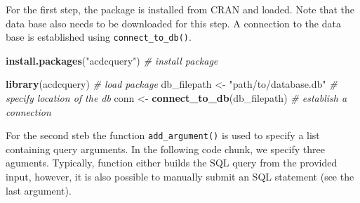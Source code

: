 \documentclass[
  man,floatsintext]{apa6}
\newenvironment{Shaded}{\begin{snugshade}}{\end{snugshade}}
\newcommand{\CommentTok}[1]{\textcolor[rgb]{0.56,0.35,0.01}{\textit{#1}}}
\newcommand{\FunctionTok}[1]{\textcolor[rgb]{0.13,0.29,0.53}{\textbf{#1}}}
\newcommand{\NormalTok}[1]{#1}
\newcommand{\OtherTok}[1]{\textcolor[rgb]{0.56,0.35,0.01}{#1}}
\newcommand{\StringTok}[1]{\textcolor[rgb]{0.31,0.60,0.02}{#1}}
\begin{document}
For the first step, the package is installed from CRAN and loaded. Note that the data base also needs to be downloaded for this step. A connection to the data base is established using \texttt{connect\_to\_db()}.

\begin{Shaded}
\begin{Highlighting}[]
\FunctionTok{install.packages}\NormalTok{(}\StringTok{"acdcquery"}\NormalTok{) }\CommentTok{\# install package}

\FunctionTok{library}\NormalTok{(acdcquery) }\CommentTok{\# load package}
\NormalTok{db\_filepath }\OtherTok{\textless{}{-}} \StringTok{"path/to/database.db"} \CommentTok{\# specify location of the db}
\NormalTok{conn }\OtherTok{\textless{}{-}} \FunctionTok{connect\_to\_db}\NormalTok{(db\_filepath) }\CommentTok{\# establish a connection}
\end{Highlighting}
\end{Shaded}

For the second steb the function \texttt{add\_argument()} is used to specify a list containing query arguments. In the following code chunk, we specify three aguments. Typically, function either builds the SQL query from the provided input, however, it is also possible to manually submit an SQL statement (see the last argument).
\end{document}
